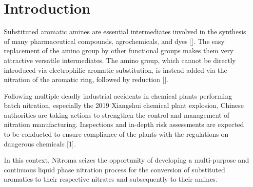 \section{Introduction}
\label{sec:introduction}
Substituted aromatic amines are essential intermediates involved in the synthesis of many pharmaceutical compounds, agrochemicals, and dyes []. The easy replacement of the amino group by other functional groups makes them very attractive versatile intermediates. The amino group, which cannot be directly introduced via electrophilic aromatic substitution, is instead added via the nitration of the aromatic ring, followed by reduction [].

Following multiple deadly industrial accidents in chemical plants performing batch nitration, especially the 2019 Xiangshui chemical plant explosion, Chinese authorities are taking actions to strengthen the control and management of nitration manufacturing. Inspections and in-depth risk assessments are expected to be conducted to ensure compliance of the plants with the regulations on dangerous chemicals [1]. 

In this context, Nitroma seizes the opportunity of developing a multi-purpose and continuous liquid phase nitration process for the conversion of substituted aromatics to their respective nitrates and subsequently to their amines. 

